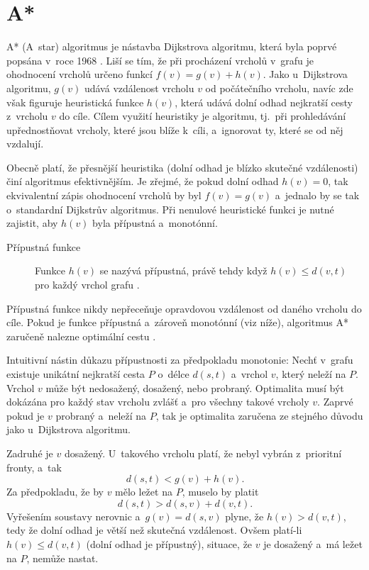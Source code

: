 \section{A*}
\label{staticASTAR}
A* (A~star) algoritmus je nástavba Dijkstrova algoritmu, která byla poprvé popsána v~roce 1968 \cite{HartAstar}. Liší se tím, že při procházení vrcholů v~grafu je ohodnocení vrcholů určeno funkcí $f(v) = g(v) + h(v)$. Jako u~Dijkstrova algoritmu, $g(v)$ udává vzdálenost vrcholu $v$ od počátečního vrcholu, navíc zde však figuruje heuristická funkce $h(v)$, která udává dolní odhad nejkratší cesty z~vrcholu $v$ do cíle. Cílem využití heuristiky je  algoritmu, tj.~při prohledávání upřednostňovat vrcholy, které jsou blíže k~cíli, a~ignorovat ty, které se od něj vzdalují.

Obecně platí, že přesnější heuristika (dolní odhad je blízko skutečné vzdálenosti) činí algoritmus efektivnějším. Je zřejmé, že pokud dolní odhad $h(v) = 0$, tak ekvivalentní zápis ohodnocení vrcholů by byl $f(v) = g(v)$ a~jednalo by se tak o~standardní Dijkstrův algoritmus. Při nenulové heuristické funkci je nutné zajistit, aby $h(v)$ byla přípustná a~monotónní.

\begin{description}
	\item[Přípustná funkce] Funkce $h(v)$ se nazývá přípustná, právě tehdy když $h(v) \leq d(v, t)$ pro každý vrchol grafu \cite{dechter1985generalized}.
\end{description}

Přípustná funkce nikdy nepřeceňuje opravdovou vzdálenost od daného vrcholu do cíle. Pokud je funkce přípustná a~zároveň monotónní (viz níže), algoritmus A* zaručeně nalezne optimální cestu \cite{Edelkamp05}.

Intuitivní nástin důkazu přípustnosti za předpokladu monotonie: Nechť v~grafu existuje unikátní nejkratší cesta \(P\) o~délce \(d(s,t)\) a~vrchol \(v\), který neleží na \(P\). Vrchol \(v\) může být nedosažený, dosažený, nebo probraný. Optimalita musí být dokázána pro každý stav vrcholu zvlášť a~pro všechny takové vrcholy \(v\). Zaprvé pokud je \(v\) probraný a~neleží na \(P\), tak je optimalita zaručena ze stejného důvodu jako u~Dijkstrova algoritmu.

Zadruhé je \(v\) dosažený. U~takového vrcholu platí, že nebyl vybrán z~prioritní fronty, a~tak \[d(s,t) < g(v) + h(v).\] Za předpokladu, že by \(v\) mělo ležet na $P$, muselo by platit \[d(s,t) > d(s,v) +d (v,t).\] Vyřešením soustavy nerovnic a~$g(v) = d(s,v)$ plyne, že $h(v) > d(v,t)$, tedy že dolní odhad je větší než skutečná vzdálenost. Ovšem platí-li $h(v) \leq d(v,t)$ (dolní odhad je přípustný), situace, že \(v\) je dosažený a~má ležet na \(P\), nemůže nastat.

